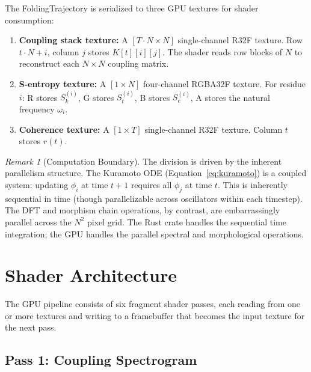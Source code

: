 \documentclass[11pt,twocolumn,a4paper]{article}
\theoremstyle{definition}
\theoremstyle{remark}
\newtheorem{remark}[theorem]{Remark}
\newcommand{\Sk}{S_k}
\newcommand{\St}{S_t}
\newcommand{\Se}{S_e}
\newcommand{\orderpar}{r}
\newcommand{\natfreq}{\omega}
\begin{document}
The FoldingTrajectory is serialized to three GPU textures for shader consumption:

\begin{enumerate}
    \item \textbf{Coupling stack texture:} A $[T \cdot N \times N]$ single-channel R32F texture. Row $t \cdot N + i$, column $j$ stores $K[t][i][j]$. The shader reads row blocks of $N$ to reconstruct each $N \times N$ coupling matrix.

    \item \textbf{S-entropy texture:} A $[1 \times N]$ four-channel RGBA32F texture. For residue $i$: R stores $\Sk^{(i)}$, G stores $\St^{(i)}$, B stores $\Se^{(i)}$, A stores the natural frequency $\natfreq_i$.

    \item \textbf{Coherence texture:} A $[1 \times T]$ single-channel R32F texture. Column $t$ stores $\orderpar(t)$.
\end{enumerate}

\begin{remark}[Computation Boundary]
The division is driven by the inherent parallelism structure. The Kuramoto ODE (Equation~\ref{eq:kuramoto}) is a coupled system: updating $\phi_i$ at time $t+1$ requires all $\phi_j$ at time $t$. This is inherently sequential in time (though parallelizable across oscillators within each timestep). The DFT and morphism chain operations, by contrast, are embarrassingly parallel across the $N^2$ pixel grid. The Rust crate handles the sequential time integration; the GPU handles the parallel spectral and morphological operations.
\end{remark}

\section{Shader Architecture}
\label{sec:shaders}

The GPU pipeline consists of six fragment shader passes, each reading from one or more textures and writing to a framebuffer that becomes the input texture for the next pass.

\subsection{Pass 1: Coupling Spectrogram}
\end{document}
